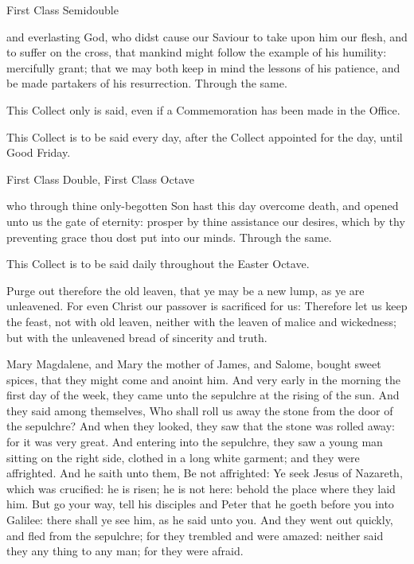 \label{PalmSunday}
\begin{inhead}
{First Class Semidouble}
\end{inhead}

\collect
{} and everlasting God, who didst cause our Saviour to take upon him our flesh, and to suffer on the cross, that mankind might follow the example of his humility: mercifully grant; that we may both keep in mind the lessons of his patience, and be made partakers of his resurrection. Through the same.
\begin{rubric}
    This Collect only is said, even if a Commemoration has been made in the Office.
\end{rubric}
\begin{rubric}
    This Collect is to be said every day, after the Collect appointed for the day, until Good Friday.
\end{rubric}


\begin{inhead}
    {First Class Double, First Class Octave}
\end{inhead}

\collect
{} who through thine only-begotten Son hast this day overcome death, and opened unto us the gate of eternity: prosper by thine assistance our desires, which by thy preventing grace thou dost put into our minds. Through the same.
\begin{rubric}
    This Collect is to be said daily throughout the Easter Octave.
\end{rubric}

 Purge out therefore the old leaven, that ye may be a new lump, as ye are unleavened. For even Christ our passover is sacrificed for us: Therefore let us keep the feast, not with old leaven, neither with the leaven of malice and wickedness; but with the unleavened bread of sincerity and truth.


 Mary Magdalene, and Mary the mother of James, and Salome, bought sweet spices, that they might come and anoint him. And very early in the morning the first day of the week, they came unto the sepulchre at the rising of the sun. And they said among themselves, Who shall roll us away the stone from the door of the sepulchre? And when they looked, they saw that the stone was rolled away: for it was very great. And entering into the sepulchre, they saw a young man sitting on the right side, clothed in a long white garment; and they were affrighted. And he saith unto them, Be not affrighted: Ye seek Jesus of Nazareth, which was crucified: he is risen; he is not here: behold the place where they laid him. But go your way, tell his disciples and Peter that he goeth before you into Galilee: there shall ye see him, as he said unto you. And they went out quickly, and fled from the sepulchre; for they trembled and were amazed: neither said they any thing to any man; for they were afraid.


